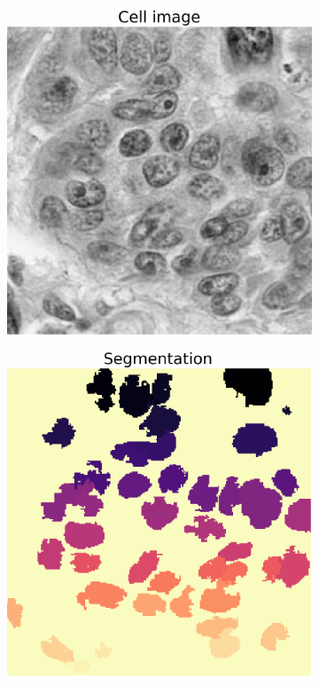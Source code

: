 \begin{figure}
	\centering
	\begin{subfigure}{0.32\linewidth}
		\centering
		\includegraphics[width=\linewidth]{Materials/cell}
	\end{subfigure}
	\hfill
	\begin{subfigure}{0.32\linewidth}
		\centering
		\includegraphics[width=\linewidth]{Materials/cellSeg}

\end{subfigure}
\end{figure}
